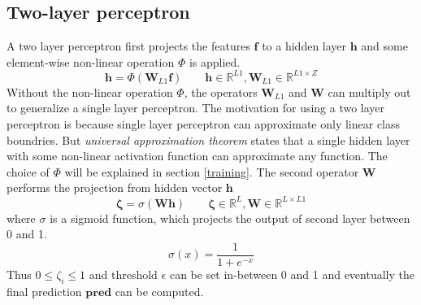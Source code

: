 \subsection{Two-layer perceptron}
A two layer perceptron first projects the features $\textbf{f}$ to a hidden layer $\textbf{h}$ and some element-wise non-linear operation $\Phi$ is applied.
\[
\textbf{h} = \Phi(\textbf{W}_{L1}\textbf{f}) \qquad \textbf{h} \in \mathbb{R}^{L1}, \textbf{W}_{L1} \in \mathbb{R}^{L1 \times Z}
\]
Without the non-linear operation $\Phi$, the operators $\textbf{W}_{L1}$ and $\textbf{W}$ can multiply out to generalize a single layer perceptron. The motivation for using a two layer perceptron is because single layer perceptron can approximate only linear class boundries. But \textit{universal approximation theorem}\cite{upt} states that a single hidden layer with some non-linear activation function can approximate any function. The choice of $\Phi$ will be explained in section \ref{training}. The second operator $\textbf{W}$ performs the projection from hidden vector $\textbf{h}$  
\[
\bm{\zeta} = \sigma (\textbf{W}\textbf{h}) \qquad \bm{\zeta} \in \mathbb{R}^{L}, \textbf{W} \in \mathbb{R}^{L \times L1}
\]
where $\sigma$ is a sigmoid function, which projects the output of second layer between 0 and 1. 
\begin{equation}
\label{sigmoid}
\sigma (x) = \frac{1}{1 + e^{-x}}
\end{equation}
Thus $0 \leq \zeta_{i} \leq 1$ and threshold $\epsilon$ can be set in-between 0 and 1 and eventually the final prediction $\textbf{pred}$ can be computed. 

